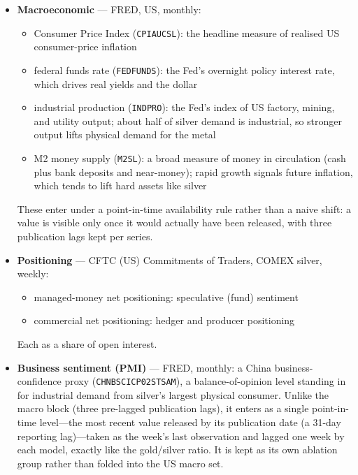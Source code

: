 \documentclass[12pt, a4paper]{article}
\begin{document}
\begin{itemize}
    \item \textbf{Macroeconomic} --- FRED, US, monthly:
    \begin{itemize}[nosep]
        \item Consumer Price Index (\texttt{CPIAUCSL}): the headline measure of realised US
        consumer-price inflation
        \item federal funds rate (\texttt{FEDFUNDS}): the Fed's overnight policy interest
        rate, which drives real yields and the dollar
        \item industrial production (\texttt{INDPRO}): the Fed's index of US factory, mining,
        and utility output; about half of silver demand is industrial, so stronger output
        lifts physical demand for the metal
        \item M2 money supply (\texttt{M2SL}): a broad measure of money in circulation (cash
        plus bank deposits and near-money); rapid growth signals future inflation, which
        tends to lift hard assets like silver
    \end{itemize}
    These enter under a point-in-time availability rule rather than a naive shift: a value
    is visible only once it would actually have been released, with three publication lags
    kept per series.

    \item \textbf{Positioning} --- CFTC (US) Commitments of Traders, COMEX silver, weekly:
    \begin{itemize}[nosep]
        \item managed-money net positioning: speculative (fund) sentiment
        \item commercial net positioning: hedger and producer positioning
    \end{itemize}
    Each as a share of open interest.

    \item \textbf{Business sentiment (PMI)} --- FRED, monthly: a China business-confidence
    proxy (\texttt{CHNBSCICP02STSAM}), a balance-of-opinion level standing in for industrial
    demand from silver's largest physical consumer. Unlike the macro block (three pre-lagged
    publication lags), it enters as a single point-in-time level---the most recent value
    released by its publication date (a 31-day reporting lag)---taken as the week's last
    observation and lagged one week by each model, exactly like the gold/silver ratio. It is
    kept as its own ablation group rather than folded into the US macro set.


\end{itemize}
\end{document}
